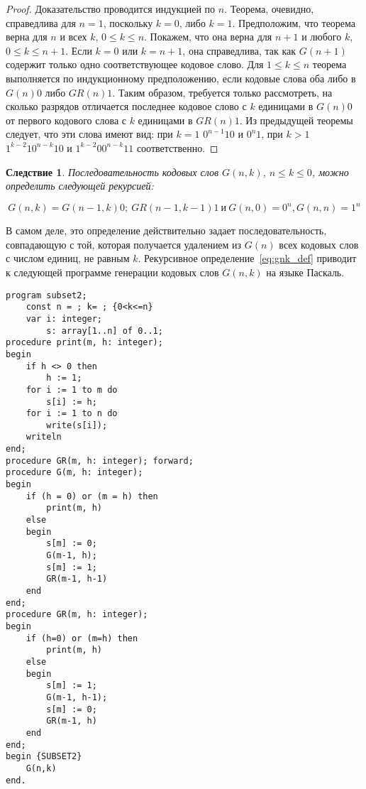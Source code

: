 \documentclass[12pt,a4paper]{article}
\theoremstyle{plain}
\newtheorem*{seq}{Следствие}
\theoremstyle{definition}
\theoremstyle{remark}
\begin{document}
\begin{proof}
Доказательство проводится индукцией по $n$. Теорема, очевидно, справедлива для $n=1$, поскольку $k=0$, либо $k=1$. Предположим, что теорема верна для $n$ и всех $k$, $0\le k\le n$. Покажем, что она верна для $n+1$ и любого $k$, $0\le k\le n+1$. Если $k=0$ или $k=n+1$, она справедлива, так как $G(n+1)$ содержит только одно соответствующее кодовое слово. Для $1\le k\le n$ теорема выполняется по индукционному предположению, если кодовые слова оба либо в $G(n)0$ либо $GR(n)1$. Таким образом, требуется только рассмотреть, на сколько разрядов отличается последнее кодовое слово с $k$ единицами в $G(n)0$ от первого кодового слова с $k$ единицами в $GR(n)1$. Из предыдущей теоремы следует, что эти слова имеют вид: при $k=1$ $0^{n-1}10$ и $0^n1$, при $k>1$ $1^{k-2}10^{n-k}10$ и $1^{k-2}00^{n-k}11$ соответственно.
\end{proof}

\begin{seq}
Последовательность кодовых слов $G(n,k)$, $n\le k\le 0$, можно определить следующей рекурсией:

\begin{equation}
\label{eq:gnk_def}
G(n,k)=G(n-1,k)0;\:GR(n-1,k-1)1\:\text{и}\:G(n,0)=0^n, G(n,n)=1^n
\end{equation}
\end{seq}

В самом деле, это определение действительно задает последовательность, совпадающую с той, которая получается удалением из $G(n)$ всех кодовых слов с числом единиц, не равным $k$. Рекурсивное определение~\eqref{eq:gnk_def} приводит к следующей программе генерации кодовых слов $G(n,k)$ на языке Паскаль.

\begin{verbatim}
program subset2;
    const n = ; k= ; {0<k<=n}
    var i: integer;
        s: array[1..n] of 0..1;
procedure print(m, h: integer);
begin
    if h <> 0 then
        h := 1;
    for i := 1 to m do
        s[i] := h;
    for i := 1 to n do
        write(s[i]);
    writeln
end;
procedure GR(m, h: integer); forward;
procedure G(m, h: integer);
begin
    if (h = 0) or (m = h) then
        print(m, h)
    else
    begin
        s[m] := 0; 
        G(m-1, h);
        s[m] := 1; 
        GR(m-1, h-1)
    end
end;
procedure GR(m, h: integer);
begin
    if (h=0) or (m=h) then
        print(m, h)
    else
    begin
        s[m] := 1;
        G(m-1, h-1);
        s[m] := 0;
        GR(m-1, h)
    end
end;
begin {SUBSET2}
    G(n,k)
end.
\end{verbatim}
\end{document}
